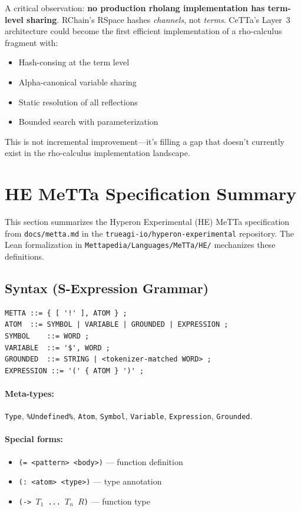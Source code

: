 \documentclass[11pt]{article}
\newcommand{\code}[1]{\texttt{#1}}
\newcommand{\HE}{\textup{HE}}
\newcommand{\CeTTa}{\textup{CeTTa}}
\begin{document}
A critical observation: \textbf{no production rholang implementation has
term-level sharing}.  RChain's RSpace hashes \emph{channels}, not
\emph{terms}.  \CeTTa{}'s Layer~3 architecture could become the first
efficient implementation of a rho-calculus fragment with:
\begin{itemize}
\item Hash-consing at the term level
\item Alpha-canonical variable sharing
\item Static resolution of all reflections
\item Bounded search with parameterization
\end{itemize}

This is not incremental improvement---it's filling a gap that doesn't
currently exist in the rho-calculus implementation landscape.

\section{HE MeTTa Specification Summary}
\label{sec:he-spec}

This section summarizes the Hyperon Experimental (\HE{}) MeTTa specification
from \code{docs/metta.md} in the \code{trueagi-io/hyperon-experimental}
repository.  The Lean formalization in \code{Mettapedia/Languages/MeTTa/HE/}
mechanizes these definitions.

\subsection{Syntax (S-Expression Grammar)}

\begin{lstlisting}[language={}]
METTA ::= { [ '!' ], ATOM } ;
ATOM  ::= SYMBOL | VARIABLE | GROUNDED | EXPRESSION ;
SYMBOL    ::= WORD ;
VARIABLE  ::= '$', WORD ;
GROUNDED  ::= STRING | <tokenizer-matched WORD> ;
EXPRESSION ::= '(' { ATOM } ')' ;
\end{lstlisting}

\paragraph{Meta-types:} \code{Type}, \code{\%Undefined\%}, \code{Atom},
\code{Symbol}, \code{Variable}, \code{Expression}, \code{Grounded}.

\paragraph{Special forms:}
\begin{itemize}[nosep]
  \item \code{(= <pattern> <body>)} --- function definition
  \item \code{(: <atom> <type>)} --- type annotation
  \item \code{(-> $T_1$ ... $T_n$ $R$)} --- function type
\end{itemize}
\end{document}
